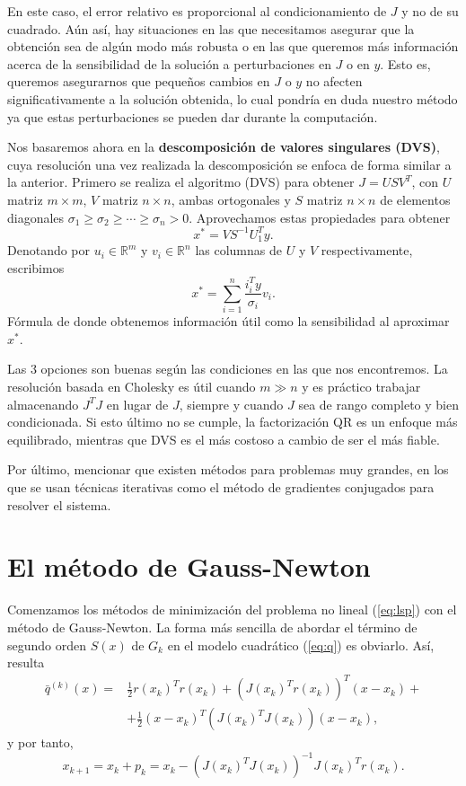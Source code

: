 \documentclass[11pt,a4paper]{book}
\theoremstyle{definition}
\theoremstyle{remark}
\begin{document}
En este caso, el error relativo es proporcional al condicionamiento de $J$ y no de su cuadrado. Aún así, hay situaciones en las que necesitamos asegurar que la obtención sea de algún modo más robusta o en las que queremos más información acerca de la sensibilidad de la solución a perturbaciones en $J$ o en $y$. Esto es, queremos asegurarnos que pequeños cambios en $J$ o $y$ no afecten significativamente a la solución obtenida, lo cual pondría en duda nuestro método ya que estas perturbaciones se pueden dar durante la computación.

Nos basaremos ahora en la \textbf{descomposición de valores singulares (DVS)}, cuya resolución una vez realizada la descomposición se enfoca de forma similar a la anterior. Primero se realiza el algoritmo (DVS) para obtener $J = USV^T$, con $U$ matriz $m \times m$, $V$ matriz $n \times n$, ambas ortogonales y $S$ matriz $n \times n$ de elementos diagonales $\sigma_1 \geq \sigma_2 \geq \cdots \geq \sigma_n > 0$. Aprovechamos estas propiedades para obtener
\begin{equation}
	x^* = VS^{-1}U_1^Ty.
\end{equation}
Denotando por $u_i \in \mathbb{R}^m$ y $v_i \in \mathbb{R}^n$ las columnas de $U$ y $V$ respectivamente, escribimos
\begin{equation}
	x^* = \sum_{i=1}^n \frac{i_i^Ty}{\sigma_i}v_i.
\end{equation}
Fórmula de donde obtenemos información útil como la sensibilidad al aproximar $x^*$.

Las 3 opciones son buenas según las condiciones en las que nos encontremos. La resolución basada en Cholesky es útil cuando $m\gg n$ y es práctico trabajar almacenando $J^TJ$ en lugar de $J$, siempre y cuando $J$ sea de rango completo y bien condicionada. Si esto último no se cumple, la factorización QR es un enfoque más equilibrado, mientras que DVS es el más costoso a cambio de ser el más fiable.

Por último, mencionar que existen métodos para problemas muy grandes, en los que se usan técnicas iterativas como el método de gradientes conjugados para resolver el sistema.

\section{El método de Gauss-Newton}

Comenzamos los métodos de minimización del problema no lineal (\ref{eq:lsp}) con el método de Gauss-Newton. La forma más sencilla de abordar el término de segundo orden $S(x)$ de $G_k$ en el modelo cuadrático (\ref{eq:q}) es obviarlo. Así, resulta
\begin{equation}
\begin{split}
\bar q^{(k)}(x) =& \frac{1}{2}r(x_k)^Tr(x_k)+(J(x_k)^Tr(x_k))^T(x-x_k)+ \\
	& +\frac{1}{2}(x-x_k)^T(J(x_k)^TJ(x_k))(x-x_k),
\end{split}
\end{equation}
y por tanto,
\begin{equation}
	x_{k+1} = x_k + p_k = x_k -(J(x_k)^TJ(x_k))^{-1}J(x_k)^Tr(x_k).
\end{equation}
\end{document}
